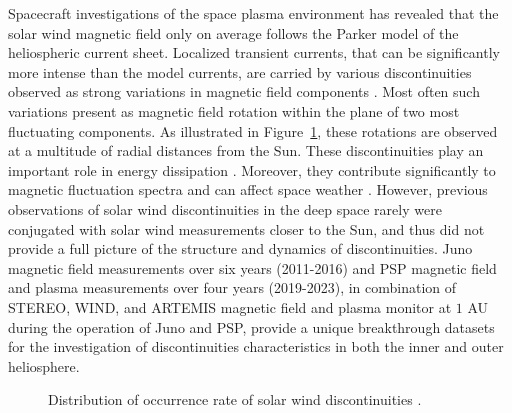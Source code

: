 \documentclass[
  letterpaper,
  DIV=11,
  numbers=noendperiod]{scrartcl}
\begin{document}
Spacecraft investigations of the space plasma environment has revealed
that the solar wind magnetic field only on average follows the Parker
model of the heliospheric current sheet. Localized transient currents,
that can be significantly more intense than the model currents, are
carried by various discontinuities observed as strong variations in
magnetic field components
\citep{colburn1966, burlagaMicroScaleStructuresInterplanetary1968, turnerOrientationsRotationalTangential1971}.
Most often such variations present as magnetic field rotation within the
plane of two most fluctuating components. As illustrated in
Figure~\ref{fig-1}, these rotations are observed at a multitude of
radial distances from the Sun. These discontinuities play an important
role in energy dissipation \citep[particle acceleration in the solar
wind,
see][]{dmitrukTestParticleEnergization2004, macbrideTurbulentCascadeAU2008, osmanIntermittencyLocalHeating2012, tesseinAssociationSuprathermalParticles2013}.
Moreover, they contribute significantly to magnetic fluctuation spectra
\citep{borovskyContributionStrongDiscontinuities2010, zhdankinMagneticDiscontinuitiesMagnetohydrodynamic2012, lionCoherentEventsSpectral2016}
and can affect space weather
\citep{tsurutaniReviewInterplanetaryDiscontinuities2011}. However,
previous observations of solar wind discontinuities in the deep space
rarely were conjugated with solar wind measurements closer to the Sun,
and thus did not provide a full picture of the structure and dynamics of
discontinuities. Juno magnetic field measurements over six years
(2011-2016) and PSP magnetic field and plasma measurements over four
years (2019-2023), in combination of STEREO, WIND, and ARTEMIS magnetic
field and plasma monitor at \(1\) AU during the operation of Juno and
PSP, provide a unique breakthrough datasets for the investigation of
discontinuities characteristics in both the inner and outer heliosphere.

\begin{figure}


\caption{\label{fig-1}Distribution of occurrence rate of solar wind
discontinuities \citep{sodingRadialLatitudinalDependencies2001}.}

\end{figure}%
\end{document}
